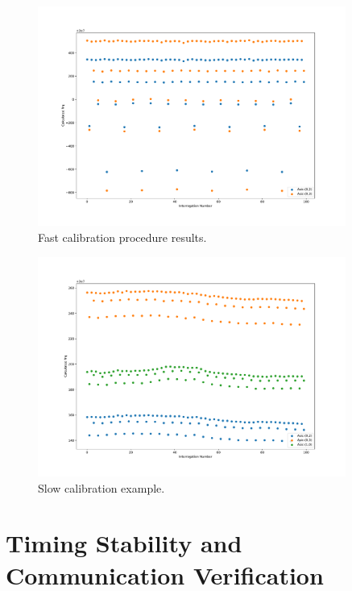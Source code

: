 \begin{figure}[]
\centering
\includegraphics[width=0.9\textwidth]{images/fast_example.pdf}
\caption{Fast calibration procedure results.}
\end{figure}

\begin{figure}[]
\centering
\includegraphics[width=0.9\textwidth]{images/slow_example.pdf}
\caption{Slow calibration example.}
\end{figure}






\section{Timing Stability and Communication Verification}~\label{sec:timing_test_results}

